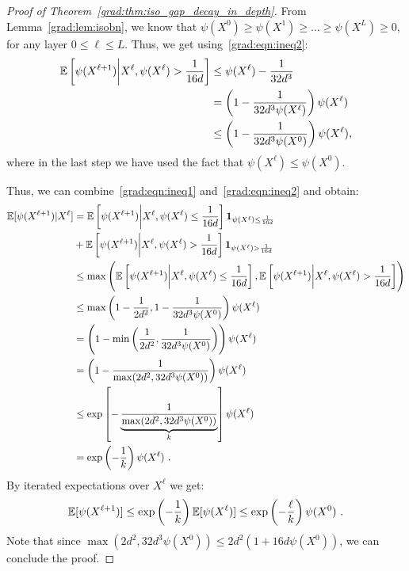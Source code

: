 \begin{proof}[Proof of Theorem~\ref{grad:thm:iso_gap_decay_in_depth}]
    From Lemma~\ref{grad:lem:isobn}, we know that $\psi(X^0) \geq \psi(X^1) \geq \dots \geq \psi(X^L) \geq 0$, for any layer $0 \leq \ell \leq L$. Thus, we get using~\eqref{grad:eqn:ineq2}:
    \begin{align}
    \mathbb{E}\left[\psi(X^{\ell+1}) \middle| X^\ell, \psi(X^\ell) > \frac{1}{16d}\right] &\leq \psi(X^\ell) - \frac{1}{32d^3} \\
    &= \left(1 - \frac{1}{32d^3\psi(X^\ell)}\right) \psi(X^\ell) \\
    &\leq \left(1 - \frac{1}{32d^3\psi(X^0)}\right) \psi(X^\ell),
    \end{align}    
    where in the last step we have used the fact that $\psi(X^\ell) \leq \psi(X^0)$.

    Thus, we can combine~\eqref{grad:eqn:ineq1} and~\eqref{grad:eqn:ineq2} and obtain:
    \begin{align}
        \mathbb{E}[\psi(X^{\ell+1}) | X^\ell] 
        &= \mathbb{E}\left[\psi(X^{\ell+1}) \middle| X^\ell, \psi(X^\ell) \leq \frac{1}{16d}\right] \bm{1}_{\psi(X^\ell) \leq \frac{1}{16d}} \\
        &+ \mathbb{E}\left[\psi(X^{\ell+1}) \middle| X^\ell, \psi(X^\ell) > \frac{1}{16d}\right] \bm{1}_{\psi(X^\ell) > \frac{1}{16d}} \\
        &\leq \max\left(\mathbb{E}\left[\psi(X^{\ell+1}) \middle| X^\ell, \psi(X^\ell) \leq \frac{1}{16d}\right], \mathbb{E}\left[\psi(X^{\ell+1}) \middle| X^\ell, \psi(X^\ell) > \frac{1}{16d}\right]\right) \\
        &\leq \max\left(1-\frac{1}{2d^2}, 1-\frac{1}{32d^3\psi(X^0)}\right) \psi(X^\ell) \\
        &= \left(1 - \min\left(\frac{1}{2d^2}, \frac{1}{32d^3\psi(X^0)}\right)\right) \psi(X^\ell) \\
        &= \left(1 - \frac{1}{\max(2d^2, 32d^3\psi(X^0))}\right) \psi(X^\ell) \\ 
        &\leq \exp \left[- \underbrace{\frac{1}{\max(2d^2, 32d^3\psi(X^0))}}_{k} \right]\psi(X^\ell) \\
        &= \exp\left(-\frac{1}{k}\right) \psi(X^\ell)~.
    \end{align}
    By iterated expectations over $X^\ell$ we get:
    \begin{align}
        \mathbb{E}[\psi(X^{\ell+1})] \leq \exp\left(-\frac{1}{k}\right) \mathbb{E}[\psi(X^\ell)] \leq \exp\left(-\frac{\ell}{k}\right) \psi(X^0)~.
    \end{align}
    Note that since $\max(2d^2, 32d^3\psi(X^0)) \leq 2d^2(1 + 16d\psi(X^0))$, we can conclude the proof.
\end{proof}

